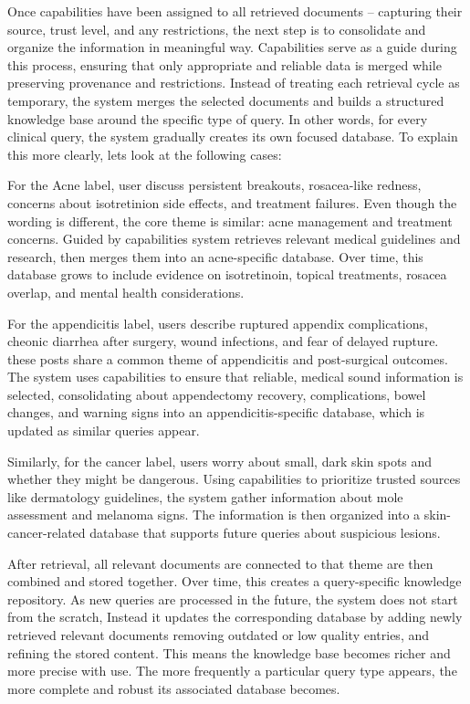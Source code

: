 \documentclass[conference, anonymous]{IEEEtran}
\begin{document}
Once capabilities have been assigned to all retrieved documents -- capturing their source, trust level, and any restrictions, the next step is to consolidate and organize the information in  meaningful way. Capabilities serve as a guide during this process, ensuring that only appropriate and reliable data is merged while preserving provenance and restrictions. Instead of treating each retrieval cycle as temporary, the system merges the selected documents and builds a structured knowledge base around the specific type of query. In other words, for every clinical query, the system gradually creates its own focused database. To explain this more clearly, lets look at the following cases:

For the Acne label, user discuss persistent breakouts, rosacea-like redness, concerns about isotretinion side effects, and treatment failures. Even though the wording is different, the core theme is similar: acne management and treatment concerns. Guided by capabilities system retrieves relevant medical guidelines and research, then merges them into an acne-specific database. Over time, this database grows to include evidence on isotretinoin, topical treatments, rosacea overlap, and mental health considerations.

For the appendicitis label, users describe ruptured appendix complications, cheonic diarrhea after surgery, wound infections, and fear of delayed rupture. these posts share a common theme of appendicitis and post-surgical outcomes. The system uses capabilities to ensure that reliable, medical sound information is selected, consolidating about appendectomy recovery, complications, bowel changes, and warning signs into an appendicitis-specific database, which is updated as similar queries appear.

Similarly, for the cancer label, users worry about small, dark skin spots and whether they might be dangerous. Using capabilities to prioritize trusted sources like dermatology guidelines, the system gather information about mole assessment and melanoma signs. The information is then organized into a skin-cancer-related database that supports future queries about suspicious lesions.

After retrieval, all relevant documents are connected to that theme are then combined and stored together. Over time, this creates a query-specific knowledge repository. As new queries are processed in the future, the system does not start from the scratch, Instead it updates the corresponding database by adding newly retrieved relevant documents removing outdated or low quality entries, and refining the stored content. This means the knowledge base becomes richer and more precise with use. The more frequently a particular query type appears, the more complete and robust its associated database becomes.  
\end{document}
